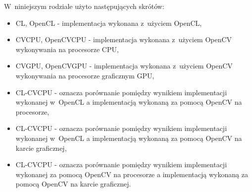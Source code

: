 W~niniejszym rodziale użyto następujących skrótów:
\begin{itemize}
\item CL, OpenCL - implementacja wykonana z~użyciem OpenCL,
\item CVCPU, OpenCVCPU - implementacja wykonana z~użyciem OpenCV wykonywania na procesorze CPU,
\item CVGPU, OpenCVGPU - implementacja wykonana z~użyciem OpenCV wykonywania na procesorze graficznym GPU,
\item CL-CVCPU - oznacza porównanie pomiędzy wynikiem implementacji wykonanej w~OpenCL a implementacją wykonaną za pomocą OpenCV na procesorze,
\item CL-CVCPU - oznacza porównanie pomiędzy wynikiem implementacji wykonanej w~OpenCL a implementacją wykonaną za pomocą OpenCV na karcie graficznej,
\item CL-CVCPU - oznacza porównanie pomiędzy wynikiem implementacji wykonanej za pomocą OpenCV na procesorze a implementacją wykonaną za pomocą OpenCV na karcie graficznej.
\end{itemize}
